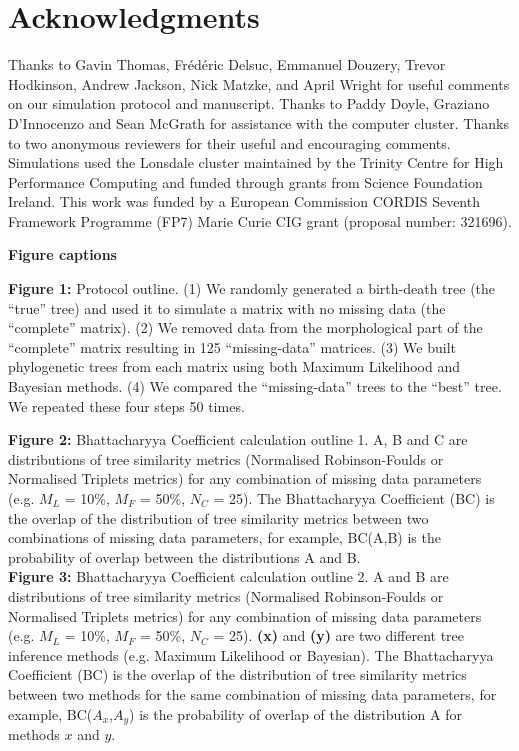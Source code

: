 \documentclass[12pt,letterpaper]{article}
\begin{document}
\section{Acknowledgments}
Thanks to Gavin Thomas, Fr\'{e}d\'{e}ric Delsuc, Emmanuel Douzery, Trevor Hodkinson, Andrew Jackson, Nick Matzke, and April Wright for useful comments on our simulation protocol and manuscript. Thanks to Paddy Doyle, Graziano D'Innocenzo and Sean McGrath for assistance with the computer cluster. Thanks to two anonymous reviewers for their useful and encouraging comments. Simulations used the Lonsdale cluster maintained by the Trinity Centre for High Performance Computing and funded through grants from Science Foundation Ireland. This work was funded by a European Commission CORDIS Seventh Framework Programme (FP7) Marie Curie CIG grant (proposal number: 321696).

\nolinenumbers




\newpage
\noindent
\textbf{Figure captions}\\
\bigskip

\noindent
\textbf{Figure 1:} Protocol outline.
(1) We randomly generated a birth-death tree (the ``true'' tree) and used it to simulate a matrix with no missing data (the ``complete'' matrix).
(2) We removed data from the morphological part of the ``complete'' matrix resulting in 125 ``missing-data'' matrices.
(3) We built phylogenetic trees from each matrix using both Maximum Likelihood and Bayesian methods.
(4) We compared the ``missing-data'' trees to the ``best'' tree.
We repeated these four steps 50 times.\\
\bigskip

\noindent
\textbf{Figure 2:} Bhattacharyya Coefficient calculation outline 1. A, B and C are distributions of tree similarity metrics (Normalised Robinson-Foulds or Normalised Triplets metrics) for any combination of missing data parameters (e.g. $M_{L}$ = 10\%, $M_{F}$ = 50\%, $N_{C}$ = 25). The Bhattacharyya Coefficient (BC) is the overlap of the distribution of tree similarity metrics between two combinations of missing data parameters, for example, BC(A,B) is the probability of overlap between the distributions A and B.\\

\noindent
\textbf{Figure 3:} Bhattacharyya Coefficient calculation outline 2. A and B are distributions of tree similarity metrics (Normalised Robinson-Foulds or Normalised Triplets metrics) for any combination of missing data parameters (e.g. $M_{L}$ = 10\%, $M_{F}$ = 50\%, $N_{C}$ = 25). \textbf{(x)} and \textbf{(y)} are two different tree inference methods (e.g. Maximum Likelihood or Bayesian). The Bhattacharyya Coefficient (BC) is the overlap of the distribution of tree similarity metrics between two methods for the same combination of missing data parameters, for example, BC($A_{x}$,$A_{y}$) is the probability of overlap of the distribution A for methods $x$ and $y$.\\
\end{document}
